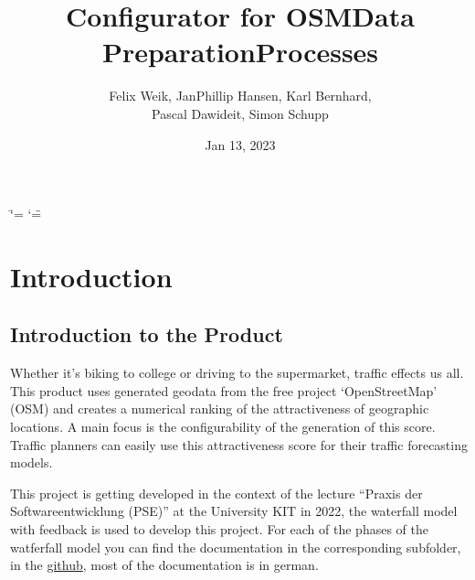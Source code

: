 \documentclass[letterpaper,10pt,english]{sphinxmanual}
\title{Configurator for OSM\sphinxhyphen{}Data Preparation\sphinxhyphen{}Processes}
\date{Jan 13, 2023}
\author{Felix Weik, Jan\sphinxhyphen{}Phillip Hansen, Karl Bernhard, \\ Pascal Dawideit, Simon Schupp}
\begin{document}
\ifdefined\shorthandoff
  \ifnum\catcode`\=\string=\active\shorthandoff{=}\fi
  \ifnum\catcode`\"=\active{}\fi
\fi

\pagestyle{empty}
\sphinxmaketitle
\pagestyle{plain}
\sphinxtableofcontents
\pagestyle{normal}
\label{\detokenize{index::doc}}






\chapter{Introduction}
\label{\detokenize{index:konfiguratorfuerosmdaten}}

\section{Introduction to the Product}
\sphinxAtStartPar
Whether it’s biking to college or driving to the supermarket, traffic
effects us all. This product uses generated geodata from the free
project ‘OpenStreetMap’ (OSM) and creates a numerical ranking of the attractiveness of geographic locations. A main focus is the
configurability of the generation of this score. 
Traffic planners can easily use this attractiveness score
for their traffic forecasting models.

\sphinxAtStartPar
{} 


\sphinxAtStartPar
This project is getting developed in the context of the lecture “Praxis der Softwareentwicklung (PSE)” at the University KIT in 2022, the waterfall model with feedback is used to develop this project.
For each of the phases of the watferfall model you can find the documentation in the corresponding subfolder, in the 
\href{https://github.com/LuposX/KonfiguratorFuerOSMDaten}{github}, most of the documentation is in german.
\end{document}
